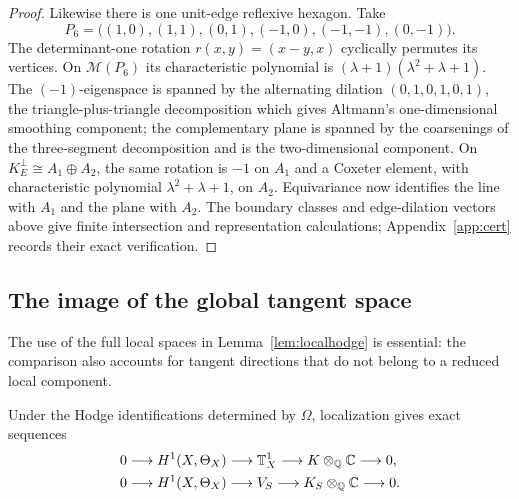 \begin{proof}
Likewise there is one unit-edge reflexive hexagon.  Take
\[
 P_6=\bigl((1,0),(1,1),(0,1),(-1,0),(-1,-1),(0,-1)\bigr).
\]
The determinant-one rotation $r(x,y)=(x-y,x)$ cyclically permutes its vertices.
On $\mathcal M(P_6)$ its characteristic polynomial is
$(\lambda+1)(\lambda^2+\lambda+1)$.  The $(-1)$-eigenspace is spanned by the
alternating dilation $(0,1,0,1,0,1)$, the triangle-plus-triangle decomposition
which gives Altmann's one-dimensional smoothing component; the complementary
plane is spanned by the coarsenings of the three-segment decomposition and is
the two-dimensional component.  On
$K_E^\perp\cong A_1\oplus A_2$, the same rotation is $-1$ on $A_1$ and a
Coxeter element, with characteristic polynomial $\lambda^2+\lambda+1$, on
$A_2$.  Equivariance now identifies the line with $A_1$ and the plane with
$A_2$.  The boundary classes and edge-dilation vectors above give finite
intersection and representation calculations; Appendix~\ref{app:cert}
records their exact verification.
\end{proof}

\subsection{The image of the global tangent space}
The use of the full local spaces in Lemma~\ref{lem:localhodge} is
essential: the comparison also accounts for tangent directions that
do not belong to a reduced local component.

\begin{theorem}\label{thm:D}
Under the Hodge identifications determined by $\Omega$, localization
gives exact sequences
\begin{align}
 0&\longrightarrow H^1(X,\Theta_X)\longrightarrow\mathbb T^1_X
                  \longrightarrow K\otimes_{\mathbb{Q}}\mathbb{C}\longrightarrow0,
                  \label{eq:fulltangent}\\
 0&\longrightarrow H^1(X,\Theta_X)\longrightarrow V_S
                  \longrightarrow K_S\otimes_{\mathbb{Q}}\mathbb{C}\longrightarrow0.
                  \label{eq:selectedtangent}
\end{align}
\end{theorem}

